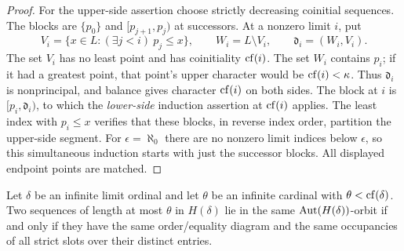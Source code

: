 \begin{proof}
For the upper-side assertion choose strictly decreasing
coinitial sequences. The blocks are $\{p_0\}$ and
$[p_{j+1},p_j)$ at successors. At a nonzero limit $i$, put
\[
V_i=\{x\in L:(\exists j<i)\ p_j\leq x\},\qquad
W_i=L\setminus V_i,\qquad \mathfrak d_i=(W_i,V_i).
\]
The set $V_i$ has no least point and has coinitiality
$\operatorname{cf}(i)$. The set $W_i$ contains $p_i$; if it had a
greatest point, that point's upper character would be
$\operatorname{cf}(i)<\kappa$. Thus $\mathfrak d_i$ is nonprincipal,
and balance gives character $\operatorname{cf}(i)$ on both sides.
The block at $i$ is $[p_i,\mathfrak d_i)$, to which the
\emph{lower-side} induction assertion at $\operatorname{cf}(i)$ applies.
The least index with $p_i\leq x$ verifies that these blocks,
in reverse index order, partition the upper-side segment.
For $\epsilon=\aleph_0$ there are no nonzero limit indices below
$\epsilon$, so this simultaneous induction starts with just the
successor blocks. All displayed endpoint points are matched.
\end{proof}

\begin{theorem}
\label{found:order-orbits}
Let $\delta$ be an infinite limit ordinal and let $\theta$ be an
infinite cardinal with $\theta<\operatorname{cf}(\delta)$. Two sequences of
length at most $\theta$ in $H(\delta)$ lie in the same
$\operatorname{Aut}(H(\delta))$-orbit if and only if they have the same
order/equality diagram and the same occupancies of all strict
slots over their distinct entries.
\end{theorem}

